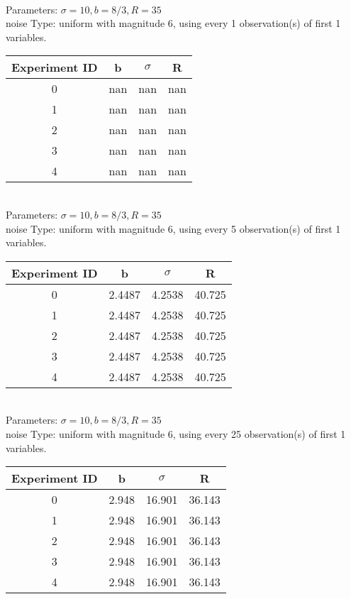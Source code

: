 \begin{multicols}{3}
\begin{tabular}{cccc}
 \end{tabular}\\
Parameters: $\sigma=10, b=8/3, R=35$\\
noise Type: uniform with magnitude 6, using every 1 observation(s) of first 1 variables.\\
\begin{tabular}{cccc}
\hline Experiment ID & b & $\sigma$ & R \\ \hline 
0 & nan & nan & nan\\ \hline 
 1 & nan & nan & nan\\ \hline 
 2 & nan & nan & nan\\ \hline 
 3 & nan & nan & nan\\ \hline 
 4 & nan & nan & nan\\ \hline 
 \end{tabular}\\
Parameters: $\sigma=10, b=8/3, R=35$\\
noise Type: uniform with magnitude 6, using every 5 observation(s) of first 1 variables.\\
\begin{tabular}{cccc}
\hline Experiment ID & b & $\sigma$ & R \\ \hline 
0 & 2.4487 & 4.2538 & 40.725\\ \hline 
 1 & 2.4487 & 4.2538 & 40.725\\ \hline 
 2 & 2.4487 & 4.2538 & 40.725\\ \hline 
 3 & 2.4487 & 4.2538 & 40.725\\ \hline 
 4 & 2.4487 & 4.2538 & 40.725\\ \hline 
 \end{tabular}\\
Parameters: $\sigma=10, b=8/3, R=35$\\
noise Type: uniform with magnitude 6, using every 25 observation(s) of first 1 variables.\\
\begin{tabular}{cccc}
\hline Experiment ID & b & $\sigma$ & R \\ \hline 
0 & 2.948 & 16.901 & 36.143\\ \hline 
 1 & 2.948 & 16.901 & 36.143\\ \hline 
 2 & 2.948 & 16.901 & 36.143\\ \hline 
 3 & 2.948 & 16.901 & 36.143\\ \hline 
 4 & 2.948 & 16.901 & 36.143\\ \hline 
 \end{tabular}\\

\end{multicols}
